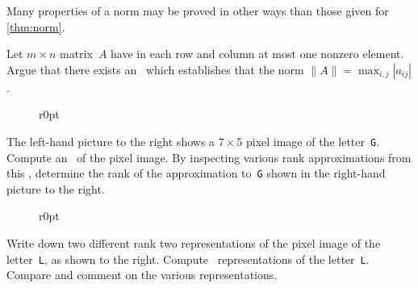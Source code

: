 \begin{exercise} \label{ex:norm} 
Many properties of a norm may be proved in other ways than those given for \cref{thm:norm}.
\end{exercise}




\begin{exercise}  
Let \(m\times n\) matrix~\(A\) have in each row and column at most one nonzero element.
Argue that there exists an \svd\ which establishes that the norm \(\|A\|=\max_{i,j}|a_{ij}|\).
\end{exercise}


\begin{exercise}
\begin{figure}r{0pt}
 \quad  
\end{figure}
The left-hand picture to the right shows a \(7\times5\) pixel image of the letter~\texttt{G}.
Compute an \svd\ of the pixel image.
By inspecting various rank approximations from this \svd, determine the rank of the approximation to~\texttt{G} shown in the right-hand picture to the right.
\end{exercise}



\begin{exercise} 
\begin{figure}r{0pt}

\end{figure}
Write down two different rank two representations of the pixel image of the letter~\verb|L|, as shown to the right.
Compute \svd\ representations of the letter~\verb|L|.  
Compare and comment on the various representations.
\end{exercise}



